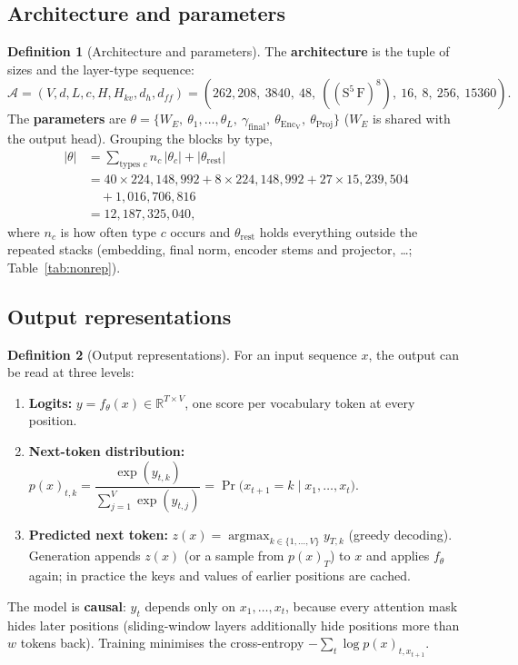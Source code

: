 \documentclass[10pt,a4paper]{article}
\newcommand{\op}[1]{\operatorname{#1}}
\theoremstyle{definition}
\newtheorem{definition}{Definition}[section]
\begin{document}
\subsection{Architecture and parameters}
\begin{definition}[Architecture and parameters]
The \textbf{architecture} is the tuple of sizes and the layer-type sequence:
\begin{equation}
  \mathcal{A} = (V,d,L,c,H,H_{kv},d_h,d_{ff}) = (262{,}208,\ 3840,\ 48,\ ((\mathrm{S}^{5}\,\mathrm{F})^{8}),\ 16,\ 8,\ 256,\ 15360).
\end{equation}
The \textbf{parameters} are $\theta=\{W_E,\ \theta_1,\dots,\theta_L,\ \gamma_{\mathrm{final}},\ \theta_{\op{Enc_V}},\ \theta_{\op{Proj}}\}$ ($W_E$ is shared with the output head). Grouping the blocks by type,
\begin{align*}
  |\theta| &= \sum_{\text{types } c} n_c\,|\theta_c| + |\theta_{\mathrm{rest}}| \\
  &= 40\times224{,}148{,}992 + 8\times224{,}148{,}992 + 27\times15{,}239{,}504 \\
  &\quad+ 1{,}016{,}706{,}816 \\
  &= 12{,}187{,}325{,}040,
\end{align*}
where $n_c$ is how often type $c$ occurs and $\theta_{\mathrm{rest}}$ holds everything outside the repeated stacks (embedding, final norm, encoder stems and projector, \dots; Table~\ref{tab:nonrep}).
\end{definition}
\subsection{Output representations}
\begin{definition}[Output representations]
For an input sequence $x$, the output can be read at three levels:
\begin{enumerate}
\item \textbf{Logits:} $y=f_\theta(x)\in\mathbb{R}^{T\times V}$, one score per vocabulary token at every position.
\item \textbf{Next-token distribution:} $p(x)_{t,k}=\dfrac{\exp(y_{t,k})}{\sum_{j=1}^{V}\exp(y_{t,j})}=\Pr\big(x_{t+1}=k\mid x_{1},\dots,x_{t}\big)$.
\item \textbf{Predicted next token:} $z(x)=\operatorname{argmax}_{k\in\{1,\dots,V\}} y_{T,k}$ (greedy decoding). Generation appends $z(x)$ (or a sample from $p(x)_{T}$) to $x$ and applies $f_\theta$ again; in practice the keys and values of earlier positions are cached.
\end{enumerate}
The model is \textbf{causal}: $y_t$ depends only on $x_1,\dots,x_t$, because every attention mask hides later positions (sliding-window layers additionally hide positions more than $w$ tokens back). Training minimises the cross-entropy $-\sum_{t}\log p(x)_{t,x_{t+1}}$.
\end{definition}
\end{document}
